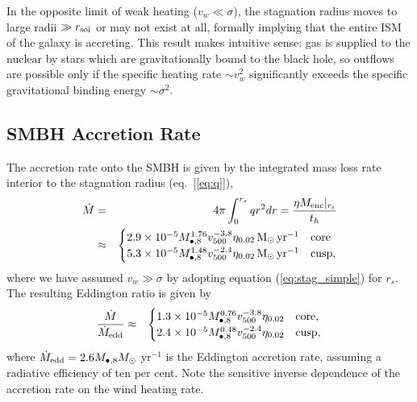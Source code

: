 \documentclass[usenatbib,fleqn]{mn2e}
\newcommand{\Menc}{M_{\rm enc}}
\newcommand{\Mbheight}{M_{\bullet,8}}
\newcommand{\pyear}{{\rm yr}^{-1}}
\renewcommand{\th}{t_h}
\begin{document}
In the opposite limit of weak heating ($v_{w} \ll \sigma$), the stagnation radius moves to large radii $\gg r_{\rm soi}$ or may not exist at all, formally implying that the entire ISM of the galaxy is accreting.  This result makes intuitive sense: gas is supplied to the nuclear by stars which are gravitationally bound to the black hole, so outflows are possible only if the specific heating rate $\sim v_{w}^{2}$ significantly exceeds the specific gravitational binding energy $\sim \sigma^{2}$.


\subsection{SMBH Accretion Rate}

The accretion rate onto the SMBH is given by the integrated mass loss rate interior to the stagnation radius (eq.~[\ref{eq:q}]), 
\begin{eqnarray}
  \dot{M} &=& 4\pi \int_{0}^{r_{s}}q r^{2}dr = \frac{\eta \Menc|_{r_{\rm s}}}{\th} \nonumber \\
&\approx&
  \begin{cases}
    2.9 \times 10^{-5} M_{\bullet,8}^{1.76}
    v_{500}^{-3.8}  \eta_{0.02} \Msun \, \pyear& \text{core} \\
    5.3 \times 10^{-5} M_{\bullet,8}^{1.48} 
    v_{500}^{-2.4}  \eta_{0.02} \Msun \, \pyear  & \text{cusp}, 
  \end{cases}
  \label{eq:mdot_analytic}
\end{eqnarray}
where we have assumed $v_{w} \gg \sigma$ by adopting equation (\ref{eq:stag_simple}) for $r_s$.  The resulting Eddington ratio is given by 
\begin{eqnarray}
\frac{\dot{M}}{\dot{M}_{\rm edd}} &\approx&
  \begin{cases}
    1.3 \times 10^{-5} M_{\bullet,8}^{0.76}
    v_{500}^{-3.8}  \eta_{0.02}   & \text{core}, \\
    2.4 \times 10^{-5} \Mbheight^{0.48} 
    v_{500}^{-2.4}  \eta_{0.02}   & \text{cusp}, 
  \end{cases}
  \label{eq:eddr_analytic}
\end{eqnarray}
where $\dot{M}_{\rm edd} = 2.6M_{\bullet,8}M_{\odot}$ yr$^{-1}$  is the Eddington accretion rate, assuming a radiative efficiency of ten per cent.  Note the sensitive inverse dependence of the accretion rate on the wind heating rate.  
\end{document}
